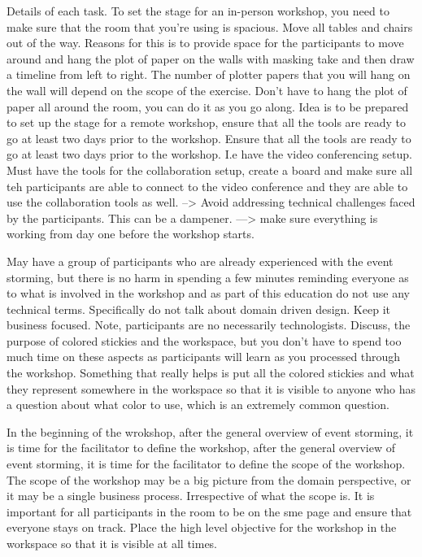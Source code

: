 \documentclass[a4paper, 11pt]{book}
\begin{document}
    Details of each task.
    To set the stage for an in-person workshop, you need to make sure that the room that you're using is spacious.
    Move all tables and chairs out of the way.
    Reasons for this is to provide space for the participants to move around and hang the plot of paper on the walls with masking take and then draw a timeline from left to right.
    The number of plotter papers that you will hang on the wall will depend on the scope of the exercise.
    Don't have to hang the plot of paper all around the room, you can do it as you go along.
    Idea is to be prepared to set up the stage for a remote workshop, ensure that all the tools are ready to go at least two days prior to the workshop.
    Ensure that all the tools are ready to go at least two days prior to the workshop.
    I.e have the video conferencing setup.
    Must have the tools for the collaboration setup, create a board and make sure all teh participants are able to connect to the video conference and they are able to use the collaboration tools as well.
    --> Avoid addressing technical challenges faced by the participants. This can be a dampener.
    ---> make sure everything is working from day one before the workshop starts.

    May have a group of participants who are already experienced with the event storming, but there is no harm in spending a few minutes reminding everyone as to what is involved in the workshop and as part of this education do not use any technical terms.
    Specifically do not talk about domain driven design.
    Keep it business focused.
    Note, participants are no necessarily technologists.
    Discuss, the purpose of colored stickies and the workspace, but you don't have to spend too much time on these aspects as participants will learn as you processed through the workshop.
    Something that really helps is put all the colored stickies and what they represent somewhere in the workspace so that it is visible to anyone who has a question about what color to use, which is an extremely common question.

    In the beginning of the wrokshop, after the general overview of event storming, it is time for the facilitator to define the workshop, after the general overview of event storming, it is time for the facilitator to define the scope of the workshop.
    The scope of the workshop may be a big picture from the domain perspective, or it may be a single business process.
    Irrespective of what the scope is.
    It is important for all participants in the room to be on the sme page and ensure that everyone stays on track.
    Place the high level objective for the workshop in the workspace so that it is visible at all times.
\end{document}
